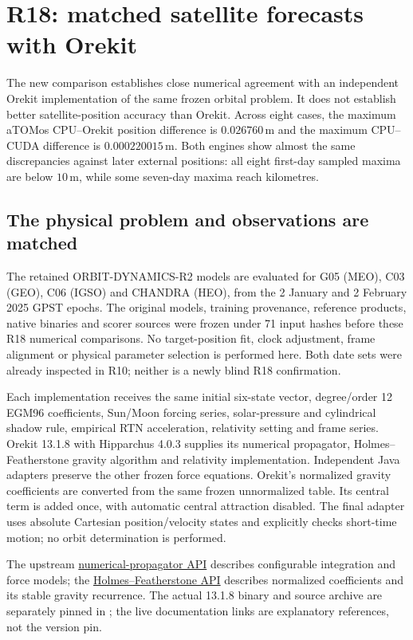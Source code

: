 \section{R18: matched satellite forecasts with Orekit}
\label{sec:r18-orbit-comparison}

\begin{panel}
The new comparison establishes close numerical agreement with an independent
Orekit implementation of the same frozen orbital problem. It does not establish
better satellite-position accuracy than Orekit. Across eight cases, the maximum
aTOMos CPU--Orekit position difference is $0.026760$\,m and the maximum
CPU--CUDA difference is $0.000220015$\,m. Both engines show almost the same
discrepancies against later external positions: all eight first-day sampled
maxima are below $10$\,m, while some seven-day maxima reach kilometres.
\end{panel}

\subsection{The physical problem and observations are matched}
The retained ORBIT-DYNAMICS-R2 models are evaluated for G05 (MEO), C03 (GEO),
C06 (IGSO) and CHANDRA (HEO), from the 2 January and 2 February 2025 GPST
epochs. The original models, training provenance, reference products, native
binaries and scorer sources were frozen under 71 input hashes before these
R18 numerical comparisons. No target-position fit, clock adjustment, frame
alignment or physical parameter selection is performed here. Both date sets
were already inspected in R10; neither is a newly blind R18 confirmation.

Each implementation receives the same initial six-state vector, degree/order
12 EGM96 coefficients, Sun/Moon forcing series, solar-pressure and cylindrical
shadow rule, empirical RTN acceleration, relativity setting and frame series.
Orekit 13.1.8 with Hipparchus 4.0.3 supplies its numerical propagator,
Holmes--Featherstone gravity algorithm and relativity implementation. Independent
Java adapters preserve the other frozen force equations. Orekit's normalized
gravity coefficients are converted from the same frozen unnormalized table.
Its central term is added once, with automatic central attraction disabled.
The final adapter uses absolute Cartesian position/velocity states and
explicitly checks short-time motion; no orbit determination is performed.

The upstream \href{https://www.orekit.org/static/apidocs/org/orekit/propagation/numerical/NumericalPropagator.html}{numerical-propagator API}
describes configurable integration and force models; the
\href{https://www.orekit.org/static/apidocs/org/orekit/forces/gravity/HolmesFeatherstoneAttractionModel.html}{Holmes--Featherstone API}
describes normalized coefficients and its stable gravity recurrence. The actual
13.1.8 binary and source archive are separately pinned in
; the live documentation links
are explanatory references, not the version pin.

